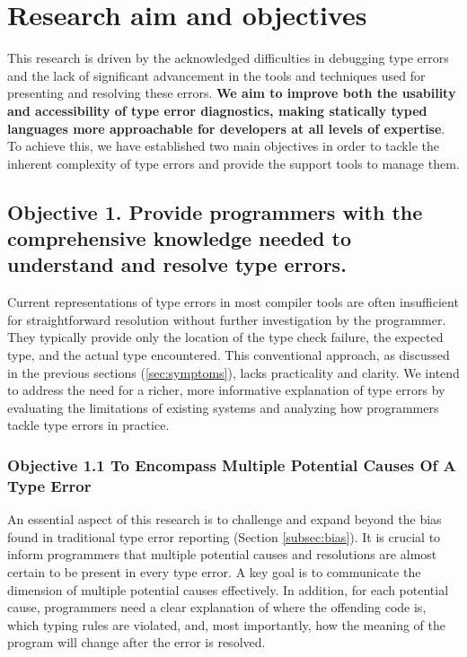 \section{Research aim and objectives}

This research is driven by the acknowledged difficulties in debugging type errors and the lack of significant advancement in the tools and techniques used for presenting and resolving these errors. \textbf{We aim to improve both the usability and accessibility of type error diagnostics, making statically typed languages more approachable for developers at all levels of expertise}. To achieve this, we have established two main objectives in order to tackle the inherent complexity of type errors and provide the support tools to manage them.

\subsection*{Objective 1. Provide programmers with the comprehensive knowledge needed to understand and resolve type errors.}
\label{subsec:aim1}

Current representations of type errors in most compiler tools are often insufficient for straightforward resolution without further investigation by the programmer. They typically provide only the location of the type check failure, the expected type, and the actual type encountered. This conventional approach, as discussed in the previous sections (\ref{sec:symptoms}), lacks practicality and clarity. We intend to address the need for a richer, more informative explanation of type errors by evaluating the limitations of existing systems and analyzing how programmers tackle type errors in practice.

\subsubsection*{Objective 1.1 To Encompass Multiple Potential Causes Of A Type Error}
An essential aspect of this research is to challenge and expand beyond the bias found in traditional type error reporting (Section \ref{subsec:bias}). It is crucial to inform programmers that multiple potential causes and resolutions are almost certain to be present in every type error. A key goal is to communicate the dimension of multiple potential causes effectively. In addition, for each potential cause, programmers need a clear explanation of where the offending code is, which typing rules are violated, and, most importantly, how the meaning of the program will change after the error is resolved.


